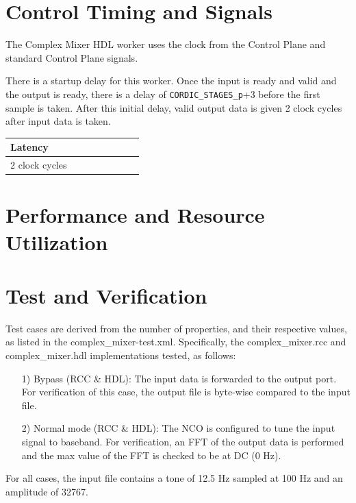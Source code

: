 \documentclass{article}
\def\comp{complex\_mixer}
\edef\ecomp{complex_mixer}
\begin{document}
\section*{Control Timing and Signals}
\begin{flushleft}
	The Complex Mixer HDL worker uses the clock from the Control Plane and standard Control Plane signals.\medskip

	There is a startup delay for this worker. Once the input is ready and valid and the output is ready, there is a delay of \verb+CORDIC_STAGES_p++3 before the first sample is taken. After this initial delay, valid output data is given 2 clock cycles after input data is taken.

	\begin{tabular}{|M{4.5cm}|M{1cm}|M{1cm}|M{1.5cm}|M{2cm}|M{1cm}|M{1cm}|M{2.5cm}|}
		\hline
		Latency         \\
		 clock cycles  \\
		\hline
	\end{tabular}
\end{flushleft}

\section*{Performance and Resource Utilization}

\section*{Test and Verification}
Test cases are derived from the number of properties, and their respective values, as listed in the complex\_mixer-test.xml. Specifically, the \comp.rcc and \comp.hdl implementations tested, as follows:
\begin{itemize}
	\item[1)] Bypass (RCC \& HDL): The input data is forwarded to the output port. For verification of this case, the output file is byte-wise compared to the input file.
	\item[2)] Normal mode (RCC \& HDL): The NCO is configured to tune the input signal to baseband. For verification, an FFT of the output data is performed and the max value of the FFT is checked to be at DC (0 Hz).
\end{itemize}
\noindent For all cases, the input file contains a tone of 12.5 Hz sampled at 100 Hz and an amplitude of 32767.\par\medskip
\end{document}
